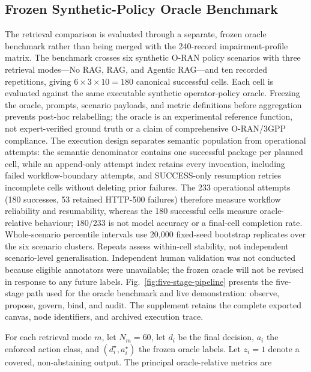 \documentclass[journal]{IEEEtran}
\newif\ifshowrevisions
\newenvironment{revision}{\begingroup\ifshowrevisions\color{blue}\else\color{black}\fi}{\endgroup}
\begin{document}
\begin{revision}
\subsection{Frozen Synthetic-Policy Oracle Benchmark}
\label{sec:oracle-method}
The retrieval comparison is evaluated through a separate, frozen oracle
benchmark rather than being merged with the 240-record impairment-profile
matrix. The benchmark crosses six synthetic O-RAN policy scenarios with three
retrieval modes---No RAG, RAG, and Agentic RAG---and ten recorded
repetitions, giving $6\times3\times10 = 180$ canonical successful cells. Each
cell is evaluated against the same executable synthetic operator-policy
oracle. Freezing the oracle, prompts, scenario payloads, and metric definitions
before aggregation prevents post-hoc relabelling; the oracle is an
experimental reference function, not expert-verified ground truth or a claim
of comprehensive O-RAN/3GPP compliance.
The execution design separates semantic population from operational
attempts: the semantic denominator contains one successful package per
planned cell, while an append-only attempt index retains every invocation,
including failed workflow-boundary attempts, and SUCCESS-only resumption
retries incomplete cells without deleting prior failures. The 233 operational
attempts (180 successes, 53 retained HTTP-500 failures) therefore measure
workflow reliability and resumability, whereas the 180 successful cells
measure oracle-relative behaviour; $180/233$ is not model accuracy or a
final-cell completion rate.
Whole-scenario percentile intervals use 20{,}000 fixed-seed bootstrap
replicates over the six scenario clusters. Repeats assess within-cell
stability, not independent scenario-level generalisation. Independent human
validation was not conducted because eligible annotators were unavailable;
the frozen oracle will not be revised in response to any future labels.
Fig.~\ref{fig:five-stage-pipeline} presents the five-stage path used for the
oracle benchmark and live demonstration: observe, propose, govern, bind, and
audit. The supplement retains the complete exported canvas, node identifiers,
and archived execution trace.

For each retrieval mode $m$, let $N_m = 60$, let $d_i$ be the final decision,
$a_i$ the enforced action class, and $(d^{\star}_i, a^{\star}_i)$ the frozen
oracle labels. Let $z_i = 1$ denote a covered, non-abstaining output. The
principal oracle-relative metrics are
{\small
\begin{align}

\end{align}}
\end{revision}
\end{document}
